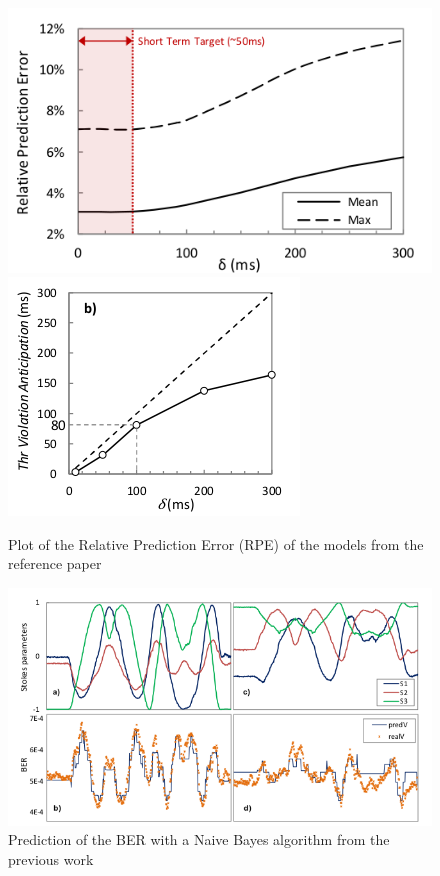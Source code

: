 \documentclass[a4paper]{article}
\begin{document}
\begin{figure}[H]
%
  \centering
    \includegraphics[width=0.9\linewidth]{img/previous_model1.png}
\endminipage\hfill
{}%
  \centering
    \includegraphics[width=0.9\linewidth]{img/previous_model2.png}
\endminipage\label{previous1}\caption{Plot of the Relative Prediction Error (RPE) of the models from the reference paper}
\end{figure}



\begin{figure}[H]
    \centering
    \includegraphics[width=0.8\linewidth]{img/previousWork_prediction.png}
    \caption{Prediction of the BER with a Naive Bayes algorithm from the previous work}
    \label{previous2}
\end{figure}
\end{document}
